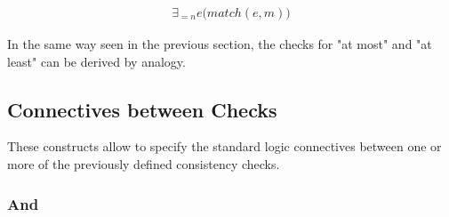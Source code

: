 \documentclass[11pt,a4paper,notitlepage]{article}
\begin{document}
\begin{multline*}
\exists_{=n} e \Big( match(e, m) \Big)
\end{multline*}

In the same way seen in the previous section, the checks for "at most" and "at least" can be derived by analogy.

\subsection{Connectives between Checks}

These constructs allow to specify the standard logic connectives between one or more of the previously defined consistency checks.

\subsubsection{And}
\end{document}
